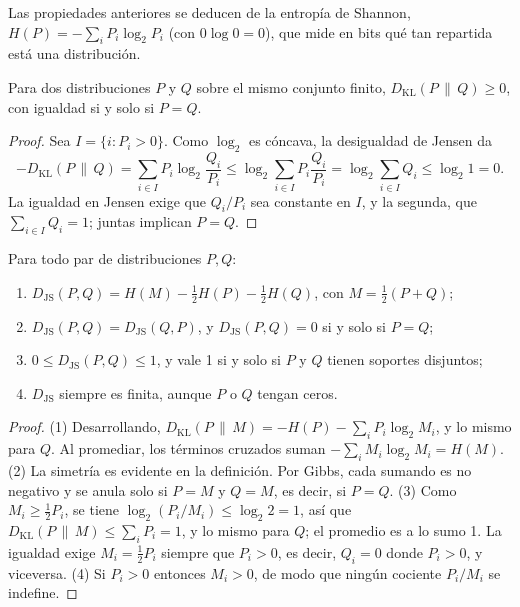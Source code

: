 Las propiedades anteriores se deducen de la entropía de Shannon, $H(P) = -\sum_i P_i \log_2 P_i$ (con $0 \log 0 = 0$),
que mide en bits qué tan repartida está una distribución.

\begin{proposicion}
Para dos distribuciones $P$ y $Q$ sobre el mismo conjunto finito, $D_{\mathrm{KL}}(P \,\|\, Q) \ge 0$, con igualdad si y
solo si $P = Q$.
\end{proposicion}

\begin{proof}
Sea $I = \{i : P_i > 0\}$. Como $\log_2$ es cóncava, la desigualdad de Jensen da
\[
  -D_{\mathrm{KL}}(P \,\|\, Q) = \sum_{i \in I} P_i \log_2 \frac{Q_i}{P_i}
  \le \log_2 \sum_{i \in I} P_i \frac{Q_i}{P_i} = \log_2 \sum_{i \in I} Q_i \le \log_2 1 = 0.
\]
La igualdad en Jensen exige que $Q_i / P_i$ sea constante en $I$, y la segunda, que $\sum_{i \in I} Q_i = 1$; juntas
implican $P = Q$.
\end{proof}

\begin{proposicion}\label{prop:js}
Para todo par de distribuciones $P, Q$:
\begin{enumerate}
  \item $D_{\mathrm{JS}}(P, Q) = H(M) - \tfrac12 H(P) - \tfrac12 H(Q)$, con $M = \tfrac12 (P + Q)$;
  \item $D_{\mathrm{JS}}(P, Q) = D_{\mathrm{JS}}(Q, P)$, y $D_{\mathrm{JS}}(P, Q) = 0$ si y solo si $P = Q$;
  \item $0 \le D_{\mathrm{JS}}(P, Q) \le 1$, y vale 1 si y solo si $P$ y $Q$ tienen soportes disjuntos;
  \item $D_{\mathrm{JS}}$ siempre es finita, aunque $P$ o $Q$ tengan ceros.
\end{enumerate}
\end{proposicion}

\begin{proof}
(1) Desarrollando, $D_{\mathrm{KL}}(P \,\|\, M) = -H(P) - \sum_i P_i \log_2 M_i$, y lo mismo para $Q$. Al promediar, los
términos cruzados suman $-\sum_i M_i \log_2 M_i = H(M)$.
(2) La simetría es evidente en la definición. Por Gibbs, cada sumando es no negativo y se anula solo si $P = M$ y
$Q = M$, es decir, si $P = Q$.
(3) Como $M_i \ge \tfrac12 P_i$, se tiene $\log_2 (P_i / M_i) \le \log_2 2 = 1$, así que
$D_{\mathrm{KL}}(P \,\|\, M) \le \sum_i P_i = 1$, y lo mismo para $Q$; el promedio es a lo sumo 1. La igualdad exige
$M_i = \tfrac12 P_i$ siempre que $P_i > 0$, es decir, $Q_i = 0$ donde $P_i > 0$, y viceversa.
(4) Si $P_i > 0$ entonces $M_i > 0$, de modo que ningún cociente $P_i / M_i$ se indefine.
\end{proof}

